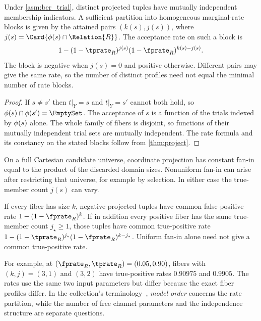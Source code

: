 \documentclass[ ../main.tex]{subfiles}
\begin{document}
\begin{theorem}
\label{thm:project_order}
Under \cref{asm:ber_trial}, distinct projected tuples have mutually independent
membership indicators. A sufficient partition into homogeneous marginal-rate
blocks is given by the attained pairs $(k(s),j(s))$, where
$j(s)=\Card{\fiber(s)\cap\Relation{R}}$. The acceptance rate on such a block is
\begin{equation}
 1-(1-\tprate_R)^{j(s)}(1-\fprate_R)^{k(s)-j(s)}.
\end{equation}
The block is negative when $j(s)=0$ and positive otherwise. Different pairs may
give the same rate, so the number of distinct profiles need not equal the
minimal number of rate blocks.
\end{theorem}
\begin{proof}
If $s \neq s'$ then $t|_Y = s$ and $t|_Y = s'$ cannot both hold, so
$\fiber(s) \cap \fiber(s') = \EmptySet$. The acceptance of $s$ is a function of
the trials indexed by $\phi(s)$ alone. The whole family of fibers is disjoint,
so functions of their mutually independent trial sets are mutually independent.
The rate formula and its constancy on the stated blocks follow from
\cref{thm:project}.
\end{proof}

On a full Cartesian candidate universe, coordinate projection has constant
fan-in equal to the product of the discarded domain sizes. Nonuniform fan-in
can arise after restricting that universe, for example by selection. In either
case the true-member count $j(s)$ can vary.

\begin{corollary}
\label{cor:uniform_fanin}
If every fiber has size $k$, negative projected tuples have common
false-positive rate $1-(1-\fprate_R)^k$. If in addition every positive fiber
has the same true-member count $j_\star\ge1$, those tuples have common
true-positive rate
$1-(1-\tprate_R)^{j_\star}(1-\fprate_R)^{k-j_\star}$.
Uniform fan-in alone need not give a common true-positive rate.
\end{corollary}

For example, at $(\fprate_R,\tprate_R)=(0.05,0.90)$, fibers with
$(k,j)=(3,1)$ and $(3,2)$ have true-positive rates $0.90975$ and $0.9905$.
The rates use the same two input parameters but differ because the exact fiber
profiles differ. In the collection's terminology~\cite{bernoulliSets},
\emph{model order} concerns the rate partition, while the number of free
channel parameters and the independence structure are separate questions.
\end{document}
